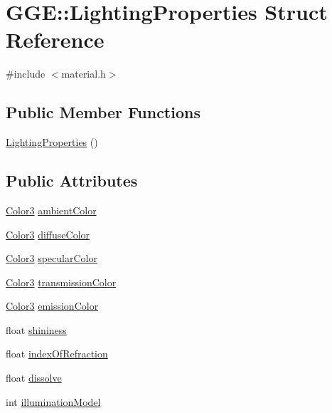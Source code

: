 \hypertarget{struct_g_g_e_1_1_lighting_properties}{\section{G\+G\+E\+:\+:Lighting\+Properties Struct Reference}
\label{struct_g_g_e_1_1_lighting_properties}
}


{\ttfamily \#include $<$material.\+h$>$}

\subsection*{Public Member Functions}
\begin{DoxyCompactItemize}
\item 
\hyperlink{struct_g_g_e_1_1_lighting_properties_ad42277828655d1158b45a3ed6e032860}{Lighting\+Properties} ()
\end{DoxyCompactItemize}
\subsection*{Public Attributes}
\begin{DoxyCompactItemize}
\item 
\hyperlink{namespace_g_g_e_ae2829723f010eeffbb96282f99792546}{Color3} \hyperlink{struct_g_g_e_1_1_lighting_properties_abc31745b5f2c2a56751c0787cc8d7748}{ambient\+Color}
\item 
\hyperlink{namespace_g_g_e_ae2829723f010eeffbb96282f99792546}{Color3} \hyperlink{struct_g_g_e_1_1_lighting_properties_a74a1886610cbeafdf5749abffac3f7fe}{diffuse\+Color}
\item 
\hyperlink{namespace_g_g_e_ae2829723f010eeffbb96282f99792546}{Color3} \hyperlink{struct_g_g_e_1_1_lighting_properties_a84af66209276135e13bc63f2b407e476}{specular\+Color}
\item 
\hyperlink{namespace_g_g_e_ae2829723f010eeffbb96282f99792546}{Color3} \hyperlink{struct_g_g_e_1_1_lighting_properties_ab454f09312d4c7e3a094ba7c1aa0bfe2}{transmission\+Color}
\item 
\hyperlink{namespace_g_g_e_ae2829723f010eeffbb96282f99792546}{Color3} \hyperlink{struct_g_g_e_1_1_lighting_properties_ad5af1aadda202f0defa618fd95d47af1}{emission\+Color}
\item 
float \hyperlink{struct_g_g_e_1_1_lighting_properties_ad8ec641aa98b22f469c31724caadb5be}{shininess}
\item 
float \hyperlink{struct_g_g_e_1_1_lighting_properties_a0cd99cfbc8d9cdc491e1d6dd6c062730}{index\+Of\+Refraction}
\item 
float \hyperlink{struct_g_g_e_1_1_lighting_properties_af6a342f051cdb44d1a43534c7709f700}{dissolve}
\item 
int \hyperlink{struct_g_g_e_1_1_lighting_properties_a9ba99a712da14ece6ce4f3139e29a145}{illumination\+Model}
\end{DoxyCompactItemize}


